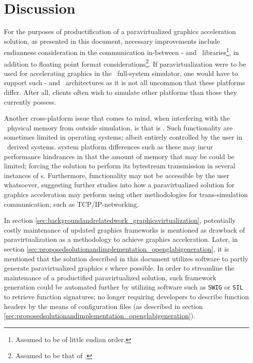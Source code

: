 
\chapter{Discussion}
\label{cha:discussion}
For the purposes of productification of a paravirtualized graphics acceleration solution, as presented in this document, necessary improvements include endianness consideration in the communication in-between \dvttermtarget - and \dvttermhost\ libraries\footnote{Assumed to be of little endian order.}, in addition to floating point format considerations\footnote{Assumed to be that of \dvttermieeefp .}.
If paravirtualization were to be used for accelerating graphics in the \dvttermsimics\ full-system simulator, one would have to support such \dvttermtarget - and \dvttermhost\ architectures as it is not all uncommon that these platforms differ.
After all, clients often wish to simulate other platforms than those they currently possess.

Another cross-platform issue that comes to mind, when interfering with the \dvttermtarget\ physical memory from outside simulation, is that is .
Such functionality are sometimes limited in operating systems; albeit entirely controlled by the user in \dvttermlinux\ derived systems.
 system platform differences such as these may incur performance hindrances in that the amount of memory that may be  could be limited; forcing the solution to perform its bytestream transmission in several instances of \dvttermmagicinstruction s.
Furthermore,  functionality may not be accessible by the user whatsoever, suggesting further studies into how a paravirtualized solution for graphics acceleration may perform using other methodologies for trans-simulation communication; such as TCP/IP-networking.

In section \ref{sec:backgroundandrelatedwork_graphicsvirtualization}, potentially costly maintenance of updated graphics frameworks is mentioned as drawback of paravirtualization as a methodology to achieve graphics acceleration.
Later, in section \ref{sec:proposedsolutionandimplementation_openglabigeneration}, it is mentioned that the solution described in this document utilizes software to partly generate paravirtualized graphics \dvttermabi s where possible.
In order to streamline the maintenance of a productified paravirtualized solution, such framework generation could be automated further by utilizing software such as \texttt{SWIG} or \texttt{SIL} to retrieve function signatures; no longer requiring developers to describe function headers by the means of configuration files (as described in section \ref{sec:proposedsolutionandimplementation_openglabigeneration}).

